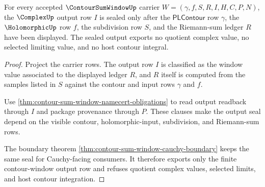 \begin{theorem}
\label{thm:contour-sum-window-output-seal-nonescape}
For every accepted $\ContourSumWindowUp$ carrier $W=(\gamma,f,S,R,I,H,C,P,N)$, the $\ComplexUp$ output row $I$ is sealed only after the $\mathsf{PLContour}$ row $\gamma$, the $\HolomorphicUp$ row $f$, the subdivision row $S$, and the Riemann-sum ledger $R$ have been displayed. The sealed output exports no quotient complex value, no selected limiting value, and no host contour integral.
\end{theorem}
\begin{proof}
Project the carrier rows. The output row $I$ is classified as the window value associated to the displayed ledger $R$, and $R$ itself is computed from the samples listed in $S$ against the contour and input rows $\gamma$ and $f$.

Use \autoref{thm:contour-sum-window-namecert-obligations} to read output readback through $I$ and package provenance through $P$. These clauses make the output seal depend on the visible contour, holomorphic-input, subdivision, and Riemann-sum rows.

The boundary theorem \autoref{thm:contour-sum-window-cauchy-boundary} keeps the same seal for Cauchy-facing consumers. It therefore exports only the finite contour-window output row and refuses quotient complex values, selected limits, and host contour integration.
\end{proof}

